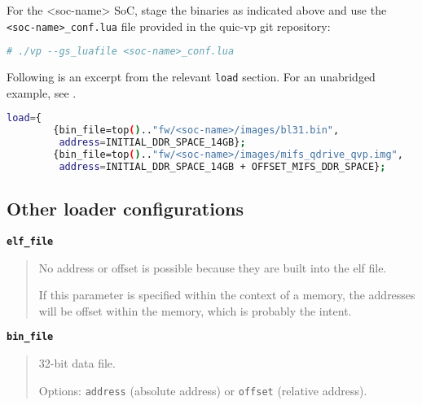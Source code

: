 For the <soc-name> SoC, stage the binaries as indicated above and use the {\small{\lstinline!<soc-name>_conf.lua!}} file provided in the quic-vp git repository:

\small
\begin{lstlisting}[language=bash]
    # ./vp --gs_luafile <soc-name>_conf.lua
\end{lstlisting}
\normalsize

\newpage

Following is an excerpt from the relevant {\small{\lstinline!load!}} section. For an unabridged example, see {}.

\small
\begin{lstlisting}[language=bash]
    load={
        {bin_file=top().."fw/<soc-name>/images/bl31.bin",
         address=INITIAL_DDR_SPACE_14GB};
        {bin_file=top().."fw/<soc-name>/images/mifs_qdrive_qvp.img",
         address=INITIAL_DDR_SPACE_14GB + OFFSET_MIFS_DDR_SPACE};
\end{lstlisting}
\normalsize


\subsection{Other loader configurations}

{\textbf {\footnotesize{\lstinline!elf_file!}}}
\vspace{-2pt}
\begin{quote}
No address or offset is possible because they are built into the elf file.

If this parameter is specified within the context of a memory, the addresses will be offset within the memory, which is probably the intent.
\end{quote}

{\textbf {\footnotesize{\lstinline!bin_file!}}}
\vspace{-2pt}
\begin{quote}
32-bit data file.

Options: {\small{\lstinline!address!}} (absolute address) or {\small{\lstinline!offset!}} (relative address).
\end{quote}


